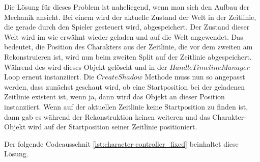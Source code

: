 Die Lösung für dieses Problem ist naheliegend, wenn man sich den Aufbau der Mechanik ansieht. Bei einem  wird der aktuelle Zustand der Welt in der Zeitlinie, die gerade durch den Spieler gesteuert wird, abgespeichert. Der Zustand dieser Welt wird im  wie erwähnt wieder geladen und auf die Welt angewendet. Das bedeutet, die Position des Charakters aus der Zeitlinie, die vor dem zweiten  am Rekonstruieren ist, wird nun beim zweiten Split auf der Zeitlinie abgespeichert. Während des  wird dieses Objekt gelöscht und in der $HandleTimelineManager$ Loop erneut instanziiert. Die $CreateShadow$ Methode muss nun so angepasst werden, dass zunächst geschaut wird, ob eine Startposition bei der geladenen Zeitlinie existent ist, wenn ja, dann wird das Objekt an dieser Position instanziiert. Wenn auf der aktuellen Zeitlinie keine Startposition zu finden ist, dann gab es während der Rekonstruktion keinen weiteren  und das Charakter-Objekt wird auf der Startposition seiner Zeitlinie positioniert. 

Der folgende Codeausschnit \ref{lst:character-controller_fixed} beinhaltet diese Lösung.

